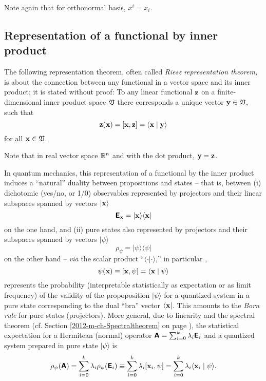 Note again that for orthonormal basis,
$x^i=x_i$.


\subsection{Representation of a functional by inner product}
\label{2011-m-corr-bil-ip}
The following representation theorem,
often called
{\em Riesz representation theorem,}
 is about the connection between any functional
in a vector space and its inner product; it is stated without proof:
To any linear functional ${\bf z}$
on a finite-dimensional inner product space ${\frak V}$
there corresponds a unique vector   ${\bf y}\in {\frak V}$,
such that
\begin{equation}
{\bf z} ({\bf x}) =[{\bf x}, {\bf z}]= \langle {\bf x}\mid {\bf y}\rangle
\end{equation}
for all ${\bf x}\in {\frak V}$.

Note that in  real vector space ${\Bbb R}^n$ and with the dot product,
 ${\bf y}={\bf z}$.


{\color{Purple}
In quantum mechanics,
this representation of a functional by the inner product induces a ``natural'' duality between
propositions and states
--
that is, between (i)
dichotomic (yes/no, or 1/0) observables
represented by projectors  and their linear subspaces  spanned by vectors  $\vert {\bf x} \rangle $
$$\textsf{\textbf{E}}_{\bf x}= \vert {\bf x} \rangle \langle {\bf x} \vert$$
on the one hand,
and (ii) pure states  also represented by projectors and their subspaces spanned by vectors  $ \vert {\psi} \rangle$
$$\rho_{\psi}= \vert \psi \rangle \langle \psi \vert$$
on the other hand
--
{\em via} the scalar product ``$\langle \cdot \vert \cdot \rangle$,''   in particular \cite{hamhalter-book},
\begin{equation}
{{\psi}} ({\bf x}) \equiv [{\bf x},  \psi ]= \langle {\bf x} \mid \psi \rangle
\end{equation}
represents the probability (interpretable statistically as expectation or as limit frequency)
of the validity of the propoposition $\vert \psi \rangle $
for a quantized system in a pure state corresponding to the dual ``bra'' vector $\langle {\bf x} \vert $.
This amounts to the {\em Born rule}  for pure states (projectors).
More general, due to linearity and the spectral theorem
(cf. Section \ref{2012-m-ch-Spectraltheorem} on page \pageref{2012-m-ch-Spectraltheorem}),
the statistical expectation for a Hermitean (normal) operator $\textsf{\textbf{A}}=
\sum_{i=0}^k   \lambda_i \textsf{\textbf{E}}_i$
and a quantized system prepared in pure state $ \vert {\psi}\rangle$
is
\begin{equation}
{\rho_{\psi}} (\textsf{\textbf{A}}) =
\sum_{i=0}^k   \lambda_i {\rho_{\psi}} (\textsf{\textbf{E}}_i)
 \equiv
\sum_{i=0}^k   \lambda_i [{\bf x}_i, {\psi}]= \sum_{i=0}^k   \lambda_i \langle {\bf x}_i \mid \psi \rangle .
\end{equation}
}


